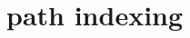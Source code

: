 \documentclass[ 
xcolor={usenames,dvipsnames,svgnames,tablem} 
,handout
]{beamer}
\begin{document}
%
%
%
\section{path indexing}
\end{document}
